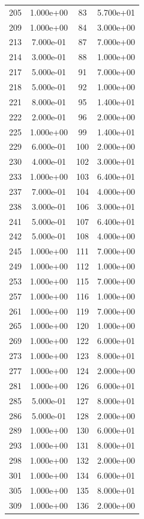 \documentclass[12pt]{article}
\begin{document}
\begin{longtable}{@{}cccc@{}}
205 & 1.000e+00 & 83 & 5.700e+01 \\
209 & 1.000e+00 & 84 & 3.000e+00 \\
213 & 7.000e-01 & 87 & 7.000e+00 \\
214 & 3.000e-01 & 88 & 1.000e+00 \\
217 & 5.000e-01 & 91 & 7.000e+00 \\
218 & 5.000e-01 & 92 & 1.000e+00 \\
221 & 8.000e-01 & 95 & 1.400e+01 \\
222 & 2.000e-01 & 96 & 2.000e+00 \\
225 & 1.000e+00 & 99 & 1.400e+01 \\
229 & 6.000e-01 & 100 & 2.000e+00 \\
230 & 4.000e-01 & 102 & 3.000e+01 \\
233 & 1.000e+00 & 103 & 6.400e+01 \\
237 & 7.000e-01 & 104 & 4.000e+00 \\
238 & 3.000e-01 & 106 & 3.000e+01 \\
241 & 5.000e-01 & 107 & 6.400e+01 \\
242 & 5.000e-01 & 108 & 4.000e+00 \\
245 & 1.000e+00 & 111 & 7.000e+00 \\
249 & 1.000e+00 & 112 & 1.000e+00 \\
253 & 1.000e+00 & 115 & 7.000e+00 \\
257 & 1.000e+00 & 116 & 1.000e+00 \\
261 & 1.000e+00 & 119 & 7.000e+00 \\
265 & 1.000e+00 & 120 & 1.000e+00 \\
269 & 1.000e+00 & 122 & 6.000e+01 \\
273 & 1.000e+00 & 123 & 8.000e+01 \\
277 & 1.000e+00 & 124 & 2.000e+00 \\
281 & 1.000e+00 & 126 & 6.000e+01 \\
285 & 5.000e-01 & 127 & 8.000e+01 \\
286 & 5.000e-01 & 128 & 2.000e+00 \\
289 & 1.000e+00 & 130 & 6.000e+01 \\
293 & 1.000e+00 & 131 & 8.000e+01 \\
298 & 1.000e+00 & 132 & 2.000e+00 \\
301 & 1.000e+00 & 134 & 6.000e+01 \\
305 & 1.000e+00 & 135 & 8.000e+01 \\
309 & 1.000e+00 & 136 & 2.000e+00 \\

\end{longtable}
\end{document}
